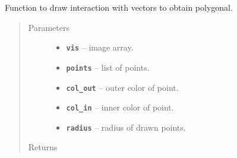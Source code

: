 \documentclass[letterpaper,10pt,english]{sphinxmanual}
\begin{document}
\begin{fulllineitems}
\label{RRtoolbox.lib:RRtoolbox.lib.image.drawcoorpolyArrow}
Function to draw interaction with vectors to obtain polygonal.
\begin{quote}\begin{description}
\item[{Parameters}] \leavevmode\begin{itemize}
\item {} 
\textbf{\texttt{vis}} -- image array.

\item {} 
\textbf{\texttt{points}} -- list of points.

\item {} 
\textbf{\texttt{col\_out}} -- outer color of point.

\item {} 
\textbf{\texttt{col\_in}} -- inner color of point.

\item {} 
\textbf{\texttt{radius}} -- radius of drawn points.

\end{itemize}

\item[{Returns}] \leavevmode


\end{description}\end{quote}

\end{fulllineitems}

\end{document}
